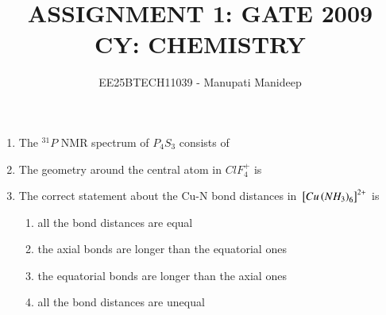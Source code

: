 \documentclass[journal,12pt,onecolumn]{IEEEtran}
\theoremstyle{remark}
\begin{document}
\title{
ASSIGNMENT 1: GATE 2009 \\
CY: CHEMISTRY}
\author{EE25BTECH11039 - Manupati Manideep}
\maketitle
\renewcommand{\thefigure}{\theenumi}
\renewcommand{\thetable}{\theenumi}
\begin{enumerate}

\item The $^{31}P$ NMR spectrum of $P_4S_3$ consists of
    \begin{enumerate}
      \hfill{}
    \end{enumerate}



\item The geometry around the central atom in $ClF_4^+$ is
    \begin{enumerate}
        \hfill{}
    \end{enumerate}



\item The correct statement about the Cu-N bond distances in ${}\left[Cu\left(NH_3\right)_6\right]^{2+}$ is
    \begin{enumerate}
        \item all the bond distances are equal
        \item the axial bonds are longer than the equatorial ones
        \item the equatorial bonds are longer than the axial ones
        \item all the bond distances are unequal
        \hfill{}
    \end{enumerate}




\end{enumerate}
\end{document}
